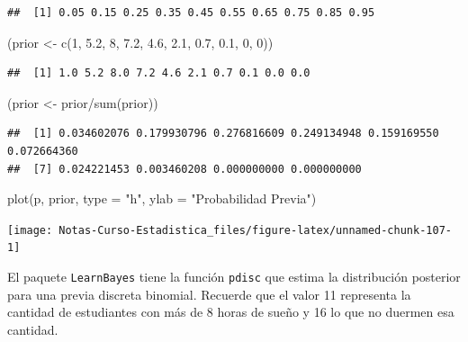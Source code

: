 \documentclass[
  12pt,
]{book}
\newenvironment{Shaded}{\begin{snugshade}}{\end{snugshade}}
\newcommand{\AttributeTok}[1]{\textcolor[rgb]{0.77,0.63,0.00}{#1}}
\newcommand{\DecValTok}[1]{\textcolor[rgb]{0.00,0.00,0.81}{#1}}
\newcommand{\FloatTok}[1]{\textcolor[rgb]{0.00,0.00,0.81}{#1}}
\newcommand{\FunctionTok}[1]{\textcolor[rgb]{0.00,0.00,0.00}{#1}}
\newcommand{\NormalTok}[1]{#1}
\newcommand{\OtherTok}[1]{\textcolor[rgb]{0.56,0.35,0.01}{#1}}
\newcommand{\SpecialCharTok}[1]{\textcolor[rgb]{0.00,0.00,0.00}{#1}}
\newcommand{\StringTok}[1]{\textcolor[rgb]{0.31,0.60,0.02}{#1}}
\theoremstyle{definition}
\theoremstyle{definition}
\theoremstyle{definition}
\theoremstyle{remark}
\begin{document}
\begin{verbatim}
##  [1] 0.05 0.15 0.25 0.35 0.45 0.55 0.65 0.75 0.85 0.95
\end{verbatim}

\begin{Shaded}
\begin{Highlighting}[]
\NormalTok{(prior }\OtherTok{\textless{}{-}} \FunctionTok{c}\NormalTok{(}\DecValTok{1}\NormalTok{, }\FloatTok{5.2}\NormalTok{, }\DecValTok{8}\NormalTok{, }\FloatTok{7.2}\NormalTok{, }\FloatTok{4.6}\NormalTok{, }\FloatTok{2.1}\NormalTok{, }\FloatTok{0.7}\NormalTok{, }\FloatTok{0.1}\NormalTok{, }\DecValTok{0}\NormalTok{, }
    \DecValTok{0}\NormalTok{))}
\end{Highlighting}
\end{Shaded}

\begin{verbatim}
##  [1] 1.0 5.2 8.0 7.2 4.6 2.1 0.7 0.1 0.0 0.0
\end{verbatim}

\begin{Shaded}
\begin{Highlighting}[]
\NormalTok{(prior }\OtherTok{\textless{}{-}}\NormalTok{ prior}\SpecialCharTok{/}\FunctionTok{sum}\NormalTok{(prior))}
\end{Highlighting}
\end{Shaded}

\begin{verbatim}
##  [1] 0.034602076 0.179930796 0.276816609 0.249134948 0.159169550 0.072664360
##  [7] 0.024221453 0.003460208 0.000000000 0.000000000
\end{verbatim}

\begin{Shaded}
\begin{Highlighting}[]
\FunctionTok{plot}\NormalTok{(p, prior, }\AttributeTok{type =} \StringTok{"h"}\NormalTok{, }\AttributeTok{ylab =} \StringTok{"Probabilidad Previa"}\NormalTok{)}
\end{Highlighting}
\end{Shaded}

\begin{center}\texttt{[image: Notas-Curso-Estadistica\_files/figure-latex/unnamed-chunk-107-1]} \end{center}

El paquete \texttt{LearnBayes} tiene la función \texttt{pdisc} que estima la
distribución posterior para una previa discreta binomial. Recuerde que
el valor 11 representa la cantidad de estudiantes con más de 8 horas
de sueño y 16 lo que no duermen esa cantidad.
\end{document}
